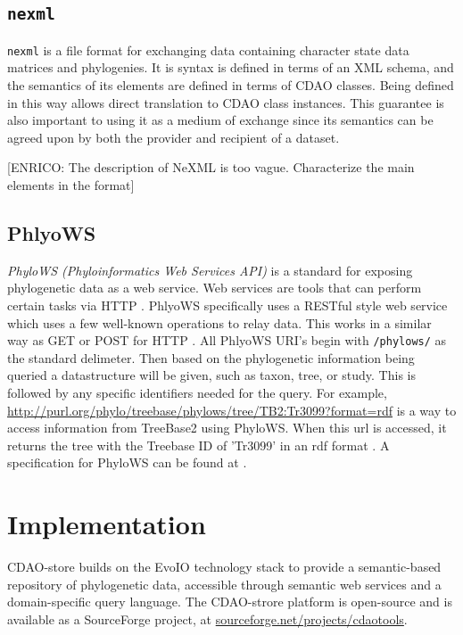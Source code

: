 \documentclass[10pt]{bmc_article}
\newenvironment{bmcformat}{\fussy\setboolean{publ}{true}}{\fussy}
\begin{document}
\begin{bmcformat}
\subsection*{\tt nexml}
  {\tt nexml} \cite{nexml} is a file format for exchanging data containing character state data
  matrices and phylogenies. It is syntax is defined in terms of an XML schema, and the semantics of its elements
  are defined in terms of CDAO classes. Being defined in this way allows direct translation to CDAO class instances.
  This guarantee is also important to using it as a medium of exchange since its semantics can be agreed upon by
  both the provider and recipient of a dataset.
  
  [ENRICO: The description of NeXML is too vague. Characterize the main elements in the format]

\subsection*{PhlyoWS}
  \emph{PhyloWS (Phyloinformatics Web Services API)} is a standard for exposing 
  phylogenetic data as a web service. Web services are tools that can perform certain tasks via HTTP \cite{WebService}.
  PhlyoWS specifically uses a RESTful style web service which uses a few well-known operations to relay data\cite{PhyloWSwiki}\cite{Fielding02principleddesign}.
  This works in a similar way as GET or POST for HTTP  \cite{Fielding02principleddesign}.  All PhlyoWS URI's begin with {\tt /phylows/} as the 
  standard delimeter. Then based on the phylogenetic information being queried a datastructure will be given, such as taxon, tree, or study.
  This is followed by any specific identifiers needed for the query.  For example, \url{http://purl.org/phylo/treebase/phylows/tree/TB2:Tr3099?format=rdf}
  is a way to access information from TreeBase2 using PhyloWS.  When this url is accessed, it returns the tree with the Treebase ID of 'Tr3099' in an
  rdf format \cite{treebasePhyloWS}. A specification for PhyloWS can be found at \cite{PhyloWSwiki}.
\section*{Implementation}

CDAO-store builds on the EvoIO technology stack to provide a 
semantic-based repository of phylogenetic data, accessible through
semantic web services and a domain-specific query language.
The CDAO-strore platform is open-source and is available as
a SourceForge project, at \url{sourceforge.net/projects/cdaotools}. 


\end{bmcformat}
\end{document}
